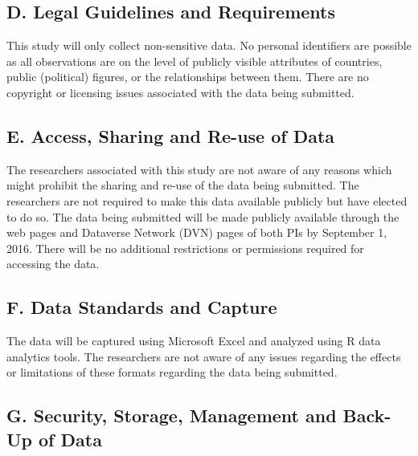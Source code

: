 \subsection*{D. Legal Guidelines and Requirements }
This study will only collect non-sensitive data. No personal identifiers are possible as all observations are on the level of publicly visible attributes of countries, public (political) figures, or the relationships between them. There are no copyright or licensing issues associated with the data being submitted.

\subsection*{E. Access, Sharing and Re-use of Data }

The researchers associated with this study are not aware of any reasons which might prohibit the
sharing and re-use of the data being submitted. The researchers are not required to make this data
available publicly but have elected to do so. The data being submitted will be made publicly available
through the web pages and Dataverse Network (DVN) pages of both PIs by September 1, 2016. There
will be no additional restrictions or permissions required for accessing the data. %

\subsection*{F. Data Standards and Capture }
The data will be captured using Microsoft Excel and analyzed using R data analytics tools. The researchers are not aware of any issues regarding the effects or limitations of these formats regarding the data being submitted.


\subsection*{G. Security, Storage, Management and Back-Up of Data }

